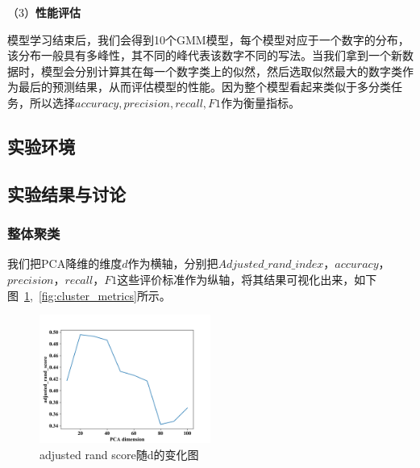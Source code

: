 \documentclass[UTF8]{ctexart}
\begin{document}
（3）\textbf{性能评估}

模型学习结束后，我们会得到10个GMM模型，每个模型对应于一个数字的分布，该分布一般具有多峰性，其不同的峰代表该数字不同的写法。当我们拿到一个新数据时，模型会分别计算其在每一个数字类上的似然，然后选取似然最大的数字类作为最后的预测结果，从而评估模型的性能。因为整个模型看起来类似于多分类任务，所以选择$accuracy, precision, recall, F1$作为衡量指标。

\subsection{实验环境}

\subsection{实验结果与讨论}

\subsubsection{整体聚类}

我们把PCA降维的维度$d$作为横轴，分别把$Adjusted\_ rand\_index$，$accuracy$，$precision$，$recall$，$F1$这些评价标准作为纵轴，将其结果可视化出来，如下图~\ref{cluster_adjusted_rand_score},~\ref{fig:cluster_metrics}所示。



\begin{figure}[!h]
  \includegraphics[width=0.5\textwidth]{./figures/cluster_adjusted_rand_score.png}
  \centering
  \caption{adjusted rand score随d的变化图}
  \label{cluster_adjusted_rand_score}
\end{figure}
\end{document}
